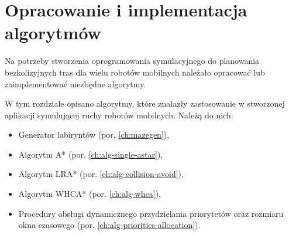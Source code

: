 \chapter{Opracowanie i implementacja algorytmów}
\label{ch:alg-impl}

Na potrzeby stworzenia oprogramowania symulacyjnego do planowania bezkolizyjnych tras dla wielu robotów mobilnych należało opracować lub zaimplementować niezbędne algorytmy.

W tym rozdziale opisano algorytmy, które znalazły zastosowanie w stworzonej aplikacji symulującej ruchy robotów mobilnych. Należą do nich:
\begin{itemize}
	\item Generator labiryntów (por. \ref{ch:mazegen}),
	\item Algorytm A* (por. \ref{ch:alg-single-astar}),
	\item Algorytm LRA* (por. \ref{ch:alg-collision-avoid}),
	\item Algorytm WHCA* (por. \ref{ch:alg-whca}),
	\item Procedury obsługi dynamicznego przydzielania priorytetów oraz rozmiaru okna czasowego (por. \ref{ch:alg-priorities-allocation}).
\end{itemize}
